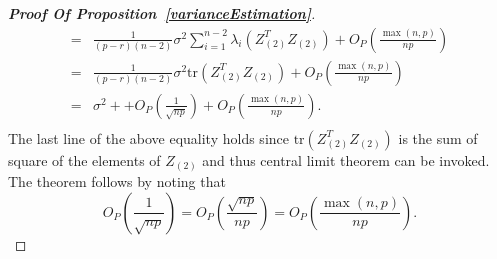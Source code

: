 \begin{proof}[\textbf{Proof Of Proposition~\ref{varianceEstimation}}]
\begin{equation*}
\begin{aligned}
             =&
    \frac{1}{(p-r)(n-2)} \sigma^2\sum_{i=1}^{n-2}\lambda_{i}(Z_{(2)}^T Z_{(2)})
             +O_P(\frac{\max(n,p)}{np})\\
             =&
             \frac{1}{(p-r)(n-2)} \sigma^2\mathrm{tr}(Z_{(2)}^T Z_{(2)})
             +O_P(\frac{\max(n,p)}{np})\\
             =&
             \sigma^2+
                +O_P(\frac{1}{\sqrt{np}})
             +O_P(\frac{\max(n,p)}{np}).\\
         \end{aligned}
     \end{equation*}
     The last line of the above equality holds since $\mathrm{tr}(Z_{(2)}^T Z_{(2)})$ is the sum of square of the elements of $Z_{(2)}$ and thus central limit theorem can be invoked.
The theorem follows by noting that
$$
    O_{P}(\frac{1}{\sqrt{np}})=O_P(\frac{\sqrt{np}}{np})= O_P(\frac{\max (n,p)}{np}).
$$


\end{proof}
